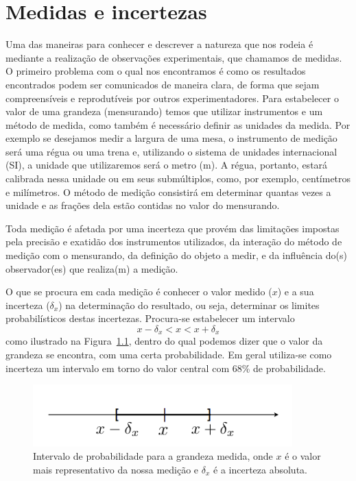 \chapter{Medidas e incertezas}
\label{sec:medidasErro}
\vspace{-0.5cm}

Uma das maneiras para conhecer e descrever a natureza que nos rodeia é mediante a realização de observações experimentais, que chamamos de medidas. O primeiro problema com o qual nos encontramos é como os resultados encontrados podem ser comunicados de maneira clara, de forma que sejam compreensíveis e reprodutíveis por outros experimentadores. Para estabelecer o valor de uma grandeza (mensurando) temos que utilizar instrumentos e um método de medida, como também é necessário definir as unidades da medida. Por exemplo se desejamos medir a largura de uma mesa, o instrumento de medição será uma régua ou uma trena e, utilizando o sistema de unidades internacional (SI), a unidade que utilizaremos será o metro (m). A régua, portanto, estará calibrada nessa unidade ou em seus submúltiplos, como, por exemplo, centímetros e milímetros. O método de medição consistirá em determinar quantas vezes a unidade e as frações dela estão contidas no valor do mensurando.

Toda medição é afetada por uma incerteza que provém das limitações impostas pela precisão e exatidão dos instrumentos utilizados, da interação do método de medição com o mensurando, da definição do objeto a medir, e da influência do(s) observador(es) que realiza(m) a medição.

O que se procura em cada medição é conhecer o valor medido ($x$) e a sua incerteza ($\delta_x$) na de\-ter\-mi\-na\-ção do resultado, ou seja, determinar os limites probabilísticos destas incertezas.  Procura-se estabelecer um intervalo
\begin{equation}
x - \delta_x < x < x + \delta_x
\end{equation}
\noindent
como ilustrado na Figura~\ref{fig:Inter}, dentro do qual podemos dizer que o valor da grandeza se encontra, com uma certa probabilidade.  Em geral utiliza-se como incerteza um intervalo em torno do valor central com 68\% de probabilidade. 
\begin{figure}[h]
\begin{center}
\includegraphics[width=10cm]{fig/IntervaloIncerteza}
\vspace{-0.5cm}
\caption{\label{fig:Inter} Intervalo de probabilidade para a grandeza medida, onde $x$ é o valor mais representativo da nossa medição e $\delta_x$ é a incerteza absoluta.}
\vspace{-0.5cm}
\end{center}
\end{figure}

